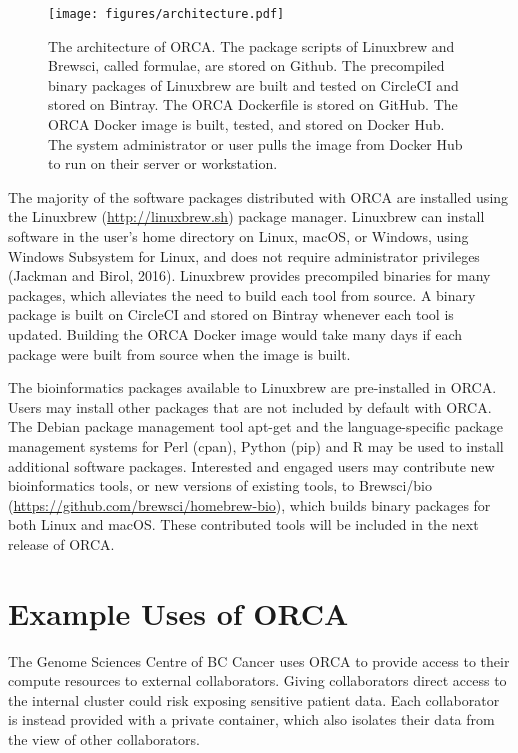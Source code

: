 \documentclass{bioinfo}
\begin{document}
\begin{figure}[b]
\centering
\texttt{[image: figures/architecture.pdf]}
\caption{The architecture of ORCA. The package scripts of Linuxbrew and Brewsci, called formulae, are stored on Github. The precompiled binary packages of Linuxbrew are built and tested on CircleCI and stored on Bintray. The ORCA Dockerfile is stored on GitHub. The ORCA Docker image is built, tested, and stored on Docker Hub. The system administrator or user pulls the image from Docker Hub to run on their server or workstation.}
\label{fig:orca}
\end{figure}

The majority of the software packages distributed with ORCA are installed using the Linuxbrew (\url{http://linuxbrew.sh}) package manager. Linuxbrew can install software in the user's home directory on Linux, macOS, or Windows, using Windows Subsystem for Linux, and does not require administrator privileges (Jackman and Birol, 2016). Linuxbrew provides precompiled binaries for many packages, which alleviates the need to build each tool from source. A binary package is built on CircleCI and stored on Bintray whenever each tool is updated. Building the ORCA Docker image would take many days if each package were built from source when the image is built.

The bioinformatics packages available to Linuxbrew are pre-installed in ORCA. Users may install other packages that are not included by default with ORCA. The Debian package management tool apt-get and the language-specific package management systems for Perl (cpan), Python (pip) and R may be used to install additional software packages. Interested and engaged users may contribute new bioinformatics tools, or new versions of existing tools, to Brewsci/bio (\url{https://github.com/brewsci/homebrew-bio}), which builds binary packages for both Linux and macOS. These contributed tools will be included in the next release of ORCA.

\section{Example Uses of ORCA}

The Genome Sciences Centre of BC Cancer uses ORCA to provide access to their compute resources to external collaborators. Giving collaborators direct access to the internal cluster could risk exposing sensitive patient data. Each collaborator is instead provided with a private container, which also isolates their data from the view of other collaborators.
\end{document}
